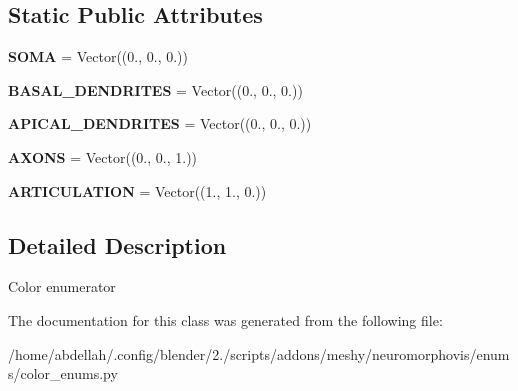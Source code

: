 \subsection*{Static Public Attributes}
\begin{DoxyCompactItemize}
\item 
{\bfseries S\+O\+MA} = Vector((0., 0., 0.))\hypertarget{classmeshy_1_1neuromorphovis_1_1enums_1_1color__enums_1_1Color_a0065e042994300a79de8653211ba7e7d}{}\label{classmeshy_1_1neuromorphovis_1_1enums_1_1color__enums_1_1Color_a0065e042994300a79de8653211ba7e7d}

\item 
{\bfseries B\+A\+S\+A\+L\+\_\+\+D\+E\+N\+D\+R\+I\+T\+ES} = Vector((0., 0., 0.))\hypertarget{classmeshy_1_1neuromorphovis_1_1enums_1_1color__enums_1_1Color_a012c3e80fb639f3488a1016e1651fbd2}{}\label{classmeshy_1_1neuromorphovis_1_1enums_1_1color__enums_1_1Color_a012c3e80fb639f3488a1016e1651fbd2}

\item 
{\bfseries A\+P\+I\+C\+A\+L\+\_\+\+D\+E\+N\+D\+R\+I\+T\+ES} = Vector((0., 0., 0.))\hypertarget{classmeshy_1_1neuromorphovis_1_1enums_1_1color__enums_1_1Color_a2bef660437224774e6b87642fb6ba4c0}{}\label{classmeshy_1_1neuromorphovis_1_1enums_1_1color__enums_1_1Color_a2bef660437224774e6b87642fb6ba4c0}

\item 
{\bfseries A\+X\+O\+NS} = Vector((0., 0., 1.))\hypertarget{classmeshy_1_1neuromorphovis_1_1enums_1_1color__enums_1_1Color_a97654b620e3defb4cb151a012146b1e3}{}\label{classmeshy_1_1neuromorphovis_1_1enums_1_1color__enums_1_1Color_a97654b620e3defb4cb151a012146b1e3}

\item 
{\bfseries A\+R\+T\+I\+C\+U\+L\+A\+T\+I\+ON} = Vector((1., 1., 0.))\hypertarget{classmeshy_1_1neuromorphovis_1_1enums_1_1color__enums_1_1Color_a95557e93a8e5389f3f21d8d77ad950e7}{}\label{classmeshy_1_1neuromorphovis_1_1enums_1_1color__enums_1_1Color_a95557e93a8e5389f3f21d8d77ad950e7}

\end{DoxyCompactItemize}


\subsection{Detailed Description}


\begin{DoxyVerb}Color enumerator
\end{DoxyVerb}
 

The documentation for this class was generated from the following file\+:\begin{DoxyCompactItemize}
\item 
/home/abdellah/.\+config/blender/2./scripts/addons/meshy/neuromorphovis/enums/color\+\_\+enums.\+py\end{DoxyCompactItemize}

